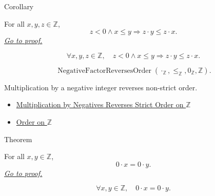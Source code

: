 \begin{corollarybox}{Corollary}
\begin{corollary}
\label{cor:negative-multiplication-reverses-order-on-z}
For all $x,y,z\in\mathbb{Z}$,
\[
z<0\land x\le y \Longrightarrow z\cdot y\le z\cdot x.
\]
\hyperref[prf:negative-multiplication-reverses-order-on-z]{\textit{Go to proof.}}
\end{corollary}
\end{corollarybox}

\begin{remark*}
\[
\forall x,y,z\in\mathbb{Z},\quad
z<0\land x\le y \Longrightarrow z\cdot y\le z\cdot x.
\]
\end{remark*}

\begin{remark*}
\[
\operatorname{NegativeFactorReversesOrder}(\cdot_{\mathbb{Z}},\le_{\mathbb{Z}},0_{\mathbb{Z}},\mathbb{Z}).
\]
\end{remark*}

\begin{remark*}[Interpretation]
Multiplication by a negative integer reverses non-strict order.
\end{remark*}

\begin{dependencies}
\begin{itemize}
  \item \hyperref[thm:negative-multiplication-reverses-strict-order-on-z]{Multiplication by Negatives Reverses Strict Order on $\mathbb{Z}$}
  \item \hyperref[def:order-on-z]{Order on $\mathbb{Z}$}
\end{itemize}
\end{dependencies}

\begin{theorembox}{Theorem}
\begin{theorem}
\label{thm:zero-multiplication-collapses-order-on-z}
For all $x,y\in\mathbb{Z}$,
\[
0\cdot x=0\cdot y.
\]
\hyperref[prf:zero-multiplication-collapses-order-on-z]{\textit{Go to proof.}}
\end{theorem}
\end{theorembox}

\begin{remark*}
\[
\forall x,y\in\mathbb{Z},\quad 0\cdot x=0\cdot y.
\]
\end{remark*}

